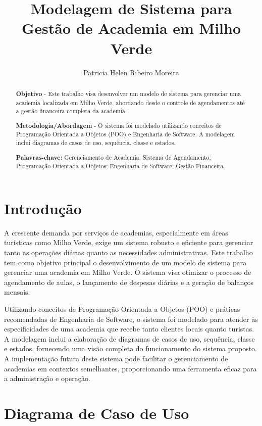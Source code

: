 \documentclass{article}
\title{Modelagem de Sistema para Gestão de Academia em Milho Verde}
\author[1]{Patricia Helen Ribeiro Moreira}
\affil[1]{Universidade Federal dos Vales do Jequitinhonha e Mucuri (UFVJM), Campus Diamantina, MG, Brasil\\\texttt{patricia.helen@ufvjm.edu.br}}
\begin{document}
\maketitle

\begin{abstract}
\textbf{Objetivo} - Este trabalho visa desenvolver um modelo de sistema para gerenciar uma academia localizada em Milho Verde, abordando desde o controle de agendamentos até a gestão financeira completa da academia.

\textbf{Metodologia/Abordagem} - O sistema foi modelado utilizando conceitos de Programação Orientada a Objetos (POO) e Engenharia de Software. A modelagem inclui diagramas de casos de uso, sequência, classe e estados.

\textbf{Palavras-chave:} Gerenciamento de Academia; Sistema de Agendamento; Programação Orientada a Objetos; Engenharia de Software; Gestão Financeira.
\end{abstract}

\section{Introdução}
A crescente demanda por serviços de academias, especialmente em áreas turísticas como Milho Verde, exige um sistema robusto e eficiente para gerenciar tanto as operações diárias quanto as necessidades administrativas. Este trabalho tem como objetivo principal o desenvolvimento de um modelo de sistema para gerenciar uma academia em Milho Verde. O sistema visa otimizar o processo de agendamento de aulas, o lançamento de despesas diárias e a geração de balanços mensais.

Utilizando conceitos de Programação Orientada a Objetos (POO) e práticas recomendadas de Engenharia de Software, o sistema foi modelado para atender às especificidades de uma academia que recebe tanto clientes locais quanto turistas. A modelagem inclui a elaboração de diagramas de casos de uso, sequência, classe e estados, fornecendo uma visão completa do funcionamento do sistema proposto. A implementação futura deste sistema pode facilitar o gerenciamento de academias em contextos semelhantes, proporcionando uma ferramenta eficaz para a administração e operação.

\section{Diagrama de Caso de Uso}

\end{document}
